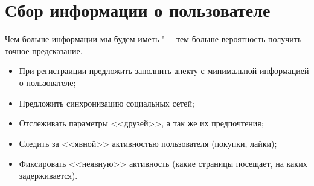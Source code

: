 \documentclass[a4paper,14pt]{article}
\begin{document}

\section{Сбор информации о пользователе }
Чем больше информации мы будем иметь "--- тем больше вероятность получить точное предсказание.
\begin{itemize}\label{inform}
\item При регистраиции предложить заполнить анекту с минимальной информацией о пользователе;
\item Предложить синхронизацию социальных сетей;
\item Отслеживать параметры <<друзей>>, а так же их предпочтения;
\item Следить за <<явной>> активностью пользователя (покупки, лайки);
\item Фиксировать <<неявную>> активность (какие страницы посещает, на каких задерживается).
\end{itemize}
\end{document}
